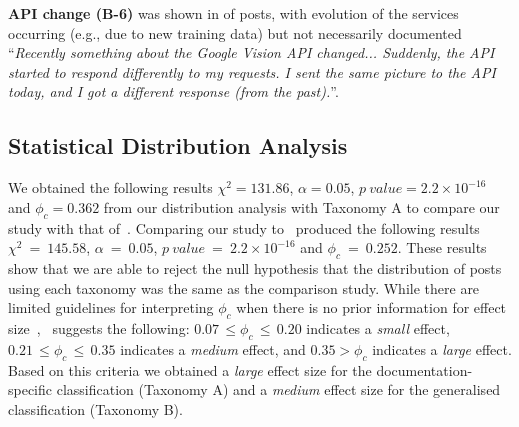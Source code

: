 \textbf{API change (B-6)} was shown in \PctTaxBAPIChange{} of posts, with evolution of the services occurring (e.g., due to new training data) but not necessarily documented ``\textit{Recently something about the Google Vision API changed... Suddenly, the API started to respond differently to my requests. I sent the same picture to the API today, and I got a different response (from the past).}''.






\subsection{Statistical Distribution Analysis}

We obtained the following results $\chi^2 = 131.86$, $\alpha = 0.05$, $p\ value = 2.2 \times 10^{-16}$ and $\phi_c=0.362$ from our distribution analysis with Taxonomy A to compare our study with that of~\citet{Aghajani:2019bo}. Comparing our study to~\citet{Beyer:2018fm} produced the following results $\chi^2~=~145.58$, $\alpha~=~0.05$, $p\ value~=~2.2 \times 10^{-16}$ and $\phi_c~=~0.252$. These results show that we are able to reject the null hypothesis that the distribution of posts using each taxonomy was the same as the comparison study. While there are limited guidelines for interpreting \(\phi_c\) when there is no prior information for effect size~\citep{Sun:2010ut},~\citeauthor{Sun:2010ut} suggests the following: $0.07\,\leq \phi_c\,\leq\,0.20$  indicates a \textit{small} effect, $0.21\,\leq \phi_c\,\leq\,0.35$ indicates a \textit{medium} effect, and $0.35 > \phi_c$ indicates a \textit{large} effect. Based on this criteria we obtained a \textit{large} effect size for the documentation-specific classification (Taxonomy A) and a \textit{medium} effect size for the generalised classification (Taxonomy B). 

